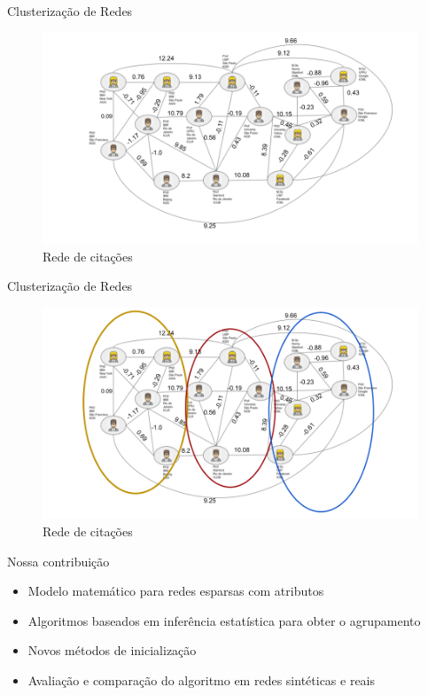\documentclass[aspectratio=169]{beamer}
\begin{document}
     \begin{frame}{Clusterização de Redes}
		\begin{figure}
			\includegraphics[scale=0.3]{img/Imagens_CTD_before.png}
			\caption{Rede de citações}
			\label{fig:imagensctdbefore}
		\end{figure}
     \end{frame}
          \begin{frame}{Clusterização de Redes}
     	\begin{figure}
     		\includegraphics[scale=0.3]{img/Imagens_CTD_after.png}
     		\caption{Rede de citações}
     		\label{fig:imagensctdafter}
     	\end{figure}
     \end{frame}
     
\begin{frame}{Nossa contribuição}
    \begin{itemize}
    	\item Modelo matemático para redes esparsas com atributos
    	\item Algoritmos baseados em inferência estatística para obter o agrupamento
        \item Novos métodos de inicialização
        \item Avaliação e comparação do algoritmo em redes sintéticas e reais
    \end{itemize}
\end{frame}
\end{document}
